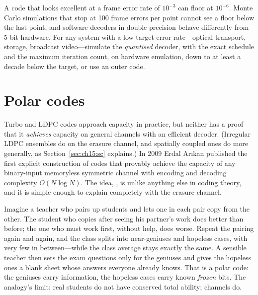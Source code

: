 \begin{pitfall}
A code that looks excellent at a frame error rate of $10^{-3}$ can floor at $10^{-6}$. Monte Carlo
simulations that stop at 100 frame errors per point cannot see a floor below the last point, and
software decoders in double precision behave differently from 5-bit hardware. For any system with a
low target error rate---optical transport, storage, broadcast video---simulate the \emph{quantised}
decoder, with the exact schedule and the maximum iteration count, on hardware emulation, down to
at least a decade below the target, or use an outer code.
\end{pitfall}

\section{Polar codes}
\label{sec:ch15:polar}

Turbo and LDPC codes approach capacity in practice, but neither has a proof that it
\emph{achieves} capacity on general channels with an efficient decoder. (Irregular LDPC ensembles do
on the erasure channel, and spatially coupled ones do more generally, as Section~\ref{sec:ch15:sc}
explains.) In 2009 Erdal Ar\i kan published the first explicit construction of codes that provably
achieve the capacity of any binary-input memoryless symmetric channel with encoding and decoding
complexity $O(N\log N)$. The idea, , is unlike anything else in coding
theory, and it is simple enough to explain completely with the erasure channel.


\begin{analogy}
Imagine a teacher who pairs up students and lets one in each pair copy from the other. The
student who copies after seeing his partner's work does better than before; the one who must work
first, without help, does worse. Repeat the pairing again and again, and the class splits into
near-geniuses and hopeless cases, with very few in between---while the class average stays
exactly the same. A sensible teacher then sets the exam questions only for the geniuses and gives
the hopeless ones a blank sheet whose answers everyone already knows. That is a polar code: the
geniuses carry information, the hopeless cases carry known \emph{frozen} bits. The analogy's
limit: real students do not have conserved total ability; channels do.
\end{analogy}

